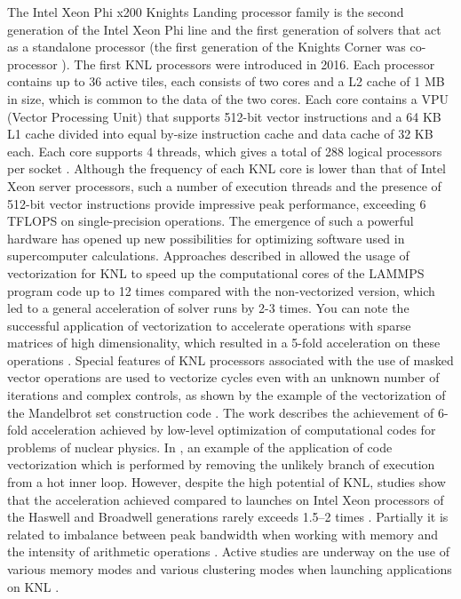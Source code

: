 \documentclass[
11pt,%
tightenlines,%
twoside,%
onecolumn,%
nofloats,%
nobibnotes,%
nofootinbib,%
superscriptaddress,%
noshowpacs,%
centertags]%
{revtex4}
\begin{document}
The Intel Xeon Phi x200 Knights Landing processor family \cite{Jeffers_KNL} is the second generation of the Intel Xeon Phi line and the first generation of solvers that act as a standalone processor (the first generation of the Knights Corner was co-processor \cite{Jeffers_KNC,Dorris}).
The first KNL processors were introduced in 2016. 
Each processor contains up to 36 active tiles, each consists of two cores and a L2 cache of 1 MB in size, which is common to the data of the two cores. 
Each core contains a VPU (Vector Processing Unit) that supports 512-bit vector instructions and a 64 KB L1 cache divided into equal by-size instruction cache and data cache of 32 KB each. 
Each core supports 4 threads, which gives a total of 288 logical processors per socket \cite{Tobin}. 
Although the frequency of each KNL core is lower than that of Intel Xeon server processors, such a number of execution threads and the presence of 512-bit vector instructions provide impressive peak performance, exceeding 6 TFLOPS on single-precision operations.
The emergence of such a powerful hardware has opened up new possibilities for optimizing software used in supercomputer calculations. 
Approaches described in \cite{McDoniel} allowed the usage of vectorization for KNL to speed up the computational cores of the LAMMPS program code up to 12 times compared with the non-vectorized version, which led to a general acceleration of solver runs by 2-3 times. 
You can note the successful application of vectorization to accelerate operations with sparse matrices of high dimensionality, which resulted in a 5-fold acceleration on these operations \cite{Malas}. 
Special features of KNL processors associated with the use of masked vector operations are used to vectorize cycles even with an unknown number of iterations and complex controls, as shown by the example of the vectorization of the Mandelbrot set construction code \cite{Krzikalla}. 
The work \cite{Cook} describes the achievement of 6-fold acceleration achieved by low-level optimization of computational codes for problems of nuclear physics. 
In \cite{Rybakov_Optimization}, an example of the application of code vectorization which is performed by removing the unlikely branch of execution from a hot inner loop.
However, despite the high potential of KNL, studies show that the acceleration achieved compared to launches on Intel Xeon processors of the Haswell and Broadwell generations rarely exceeds 1.5--2 times \cite{Sengupta,Kronbichler}. 
Partially it is related to imbalance between peak bandwidth when working with memory and the intensity of arithmetic operations \cite{Doerfler}. 
Active studies are underway on the use of various memory modes and various clustering modes when launching applications on KNL \cite{Rosales}.
\end{document}
